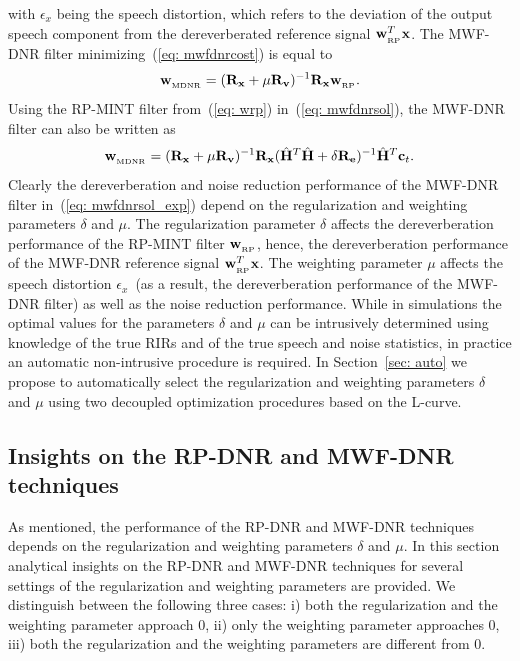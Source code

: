 \documentclass[draftcls,onecolumn,11pt]{IEEEtran}
\begin{document}
with $\epsilon_{x}$ being the speech distortion, which refers to the deviation of the output speech component from the dereverberated reference signal $\mathbf{w}_{_{\rm RP}}^T\mathbf{x}$.
The MWF-DNR filter minimizing~(\ref{eq: mwfdnrcost}) is equal to
\begin{equation}
  \label{eq: mwfdnrsol}
\mathbf{w}_{_{\rm MDNR}} = (\mathbf{R}_{\mathbf{x}} + \mu \mathbf{R}_{\mathbf{v}})^{-1}\mathbf{R}_{\mathbf{x}}\mathbf{w}_{_{\rm RP}}.
\end{equation}
Using the RP-MINT filter from~(\ref{eq: wrp}) in~(\ref{eq: mwfdnrsol}), the MWF-DNR filter can also be written as
\begin{equation}
\label{eq: mwfdnrsol_exp}
\mathbf{w}_{_{\rm MDNR}} = (\mathbf{R}_{\mathbf{x}} + \mu \mathbf{R}_{\mathbf{v}})^{-1}\mathbf{R}_{\mathbf{x}}(\hat{\mathbf{H}}^T\hat{\mathbf{H}}+\delta\mathbf{R}_{\mathbf{e}})^{-1} \hat{\mathbf{H}}^T\mathbf{c}_t.
\end{equation}
Clearly the dereverberation and noise reduction performance of the MWF-DNR filter in~(\ref{eq: mwfdnrsol_exp}) depend on the regularization and weighting parameters $\delta$ and $\mu$.
The regularization parameter $\delta$ affects the dereverberation performance of the RP-MINT filter $\mathbf{w}_{_{\rm RP}}$, hence, the dereverberation performance of the MWF-DNR reference signal $\mathbf{w}_{_{\rm RP}}^T\mathbf{x}$.
The weighting parameter $\mu$ affects the speech distortion $\epsilon_x$~(as a result, the dereverberation performance of the MWF-DNR filter) as well as the noise reduction performance.
While in simulations the optimal values for the parameters $\delta$ and $\mu$ can be intrusively determined using knowledge of the true RIRs and of the true speech and noise statistics, in practice an automatic non-intrusive procedure is required.
In Section~\ref{sec: auto} we propose to automatically select the regularization and weighting parameters $\delta$ and $\mu$ using two decoupled optimization procedures based on the L-curve.
\subsection{Insights on the RP-DNR and MWF-DNR techniques}
\label{sec: theo}
As mentioned, the performance of the RP-DNR and MWF-DNR techniques depends on the regularization and weighting parameters $\delta$ and $\mu$.
In this section analytical insights on the RP-DNR and MWF-DNR techniques for several settings of the regularization and weighting parameters are provided.
We distinguish between the following three cases: i) both the regularization and the weighting parameter approach $0$, ii) only the weighting parameter approaches $0$, iii) both the regularization and the weighting parameters are different from $0$.
\end{document}
